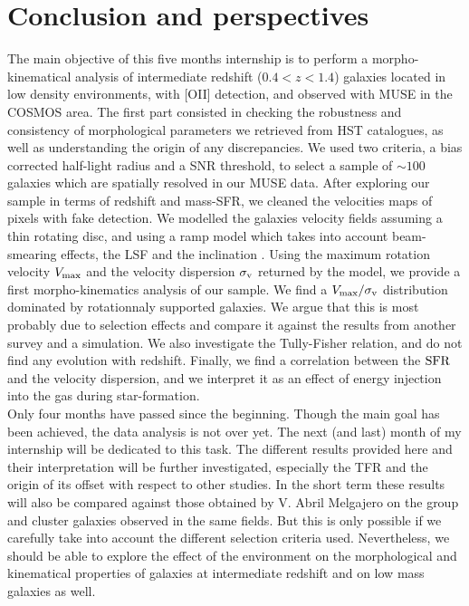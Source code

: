 \clearpage
\section{Conclusion and perspectives}

The main objective of this five months internship is to perform a morpho-kinematical analysis of intermediate redshift ($0.4 < z < 1.4$) galaxies located in low density environments, with [OII] detection, and observed with MUSE in the COSMOS area. The first part consisted in checking the robustness and consistency of morphological parameters we retrieved from HST catalogues, as well as understanding the origin of any discrepancies. We used two criteria, a bias corrected half-light radius and a SNR threshold, to select a sample of $\sim 100$ galaxies which are spatially resolved in our MUSE data. After exploring our sample in terms of redshift and mass-SFR, we cleaned the velocities maps of pixels with fake detection. We modelled the galaxies velocity fields assuming a thin rotating disc, and using a ramp model which takes into account beam-smearing effects, the LSF and the inclination . Using the maximum rotation velocity $V_{\rm{max}}$ and the velocity dispersion $\sigma_{\rm{v}}$ returned by the model, we provide a first morpho-kinematics analysis of our sample. We find a $V_{\rm{max}} / \sigma_{\rm{v}}$ distribution dominated by rotationnaly supported galaxies. We argue that this is most probably due to selection effects and compare it against the results from another survey and a simulation. We also investigate the Tully-Fisher relation, and do not find any evolution with redshift. Finally, we find a correlation between the $\rm{SFR}$ and the velocity dispersion, and we interpret it as an effect of energy injection into the gas during star-formation.\\

Only four months have passed since the beginning. Though the main goal has been achieved, the data analysis is not over yet. The next (and last) month of my internship will be dedicated to this task. The different results provided here and their interpretation will be further investigated, especially the TFR and the origin of its offset with respect to other studies. In the short term these results will also be compared against those obtained by V. Abril Melgajero on the group and cluster galaxies observed in the same fields. But this is only possible if we carefully take into account the different selection criteria used. Nevertheless, we should be able to explore the effect of the environment on the morphological and kinematical properties of galaxies at intermediate redshift and on low mass galaxies as well. 

